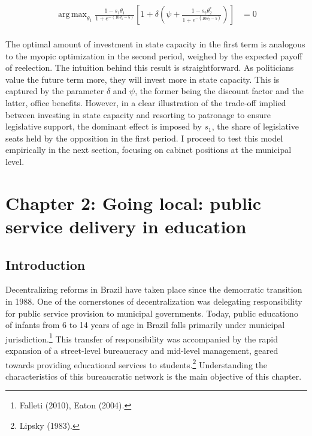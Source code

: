 \documentclass[12pt,]{article}
\let\rmarkdownfootnote\footnote%
\def\footnote{\protect\rmarkdownfootnote}
\DeclareMathOperator*{\argmax}{arg\,max}
\begin{document}
\begin{align*}
\argmax_{\theta_1} \frac{1-s_1\theta_1}{1+e^{-(10\theta_1-5)}}\left[1+\delta\left(\psi + \frac{1-s_2\theta_2^*}{1+e^{-(10\theta_2^*-5)}}\right)\right] &= 0 \\
\end{align*}

The optimal amount of investment in state capacity in the first term is
analogous to the myopic optimization in the second period, weighed by
the expected payoff of reelection. The intuition behind this result is
straightforward. As politicians value the future term more, they will
invest more in state capacity. This is captured by the parameter
\(\delta\) and \(\psi\), the former being the discount factor and the
latter, office benefits. However, in a clear illustration of the
trade-off implied between investing in state capacity and resorting to
patronage to ensure legislative support, the dominant effect is imposed
by \(s_1\), the share of legislative seats held by the opposition in the
first period. I proceed to test this model empirically in the next
section, focusing on cabinet positions at the municipal level.

\pagebreak

\hypertarget{chapter-2-going-local-public-service-delivery-in-education}{%
\section{Chapter 2: Going local: public service delivery in
education}\label{chapter-2-going-local-public-service-delivery-in-education}}

\hypertarget{introduction-1}{%
\subsection{Introduction}\label{introduction-1}}

Decentralizing reforms in Brazil have taken place since the democratic
transition in 1988. One of the cornerstones of decentralization was
delegating responsibility for public service provision to municipal
governments. Today, public educationo of infants from 6 to 14 years of
age in Brazil falls primarily under municipal jurisdiction.\footnote{Falleti
  (2010), Eaton (2004).} This transfer of responsibility was accompanied
by the rapid expansion of a street-level bureaucracy and mid-level
management, geared towards providing educational services to
students.\footnote{Lipsky (1983).} Understanding the characteristics of
this bureaucratic network is the main objective of this chapter.
\end{document}
